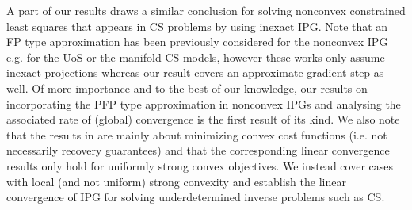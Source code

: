 A part of our results draws a similar conclusion for solving nonconvex constrained least squares that appears in CS problems by using inexact IPG. Note that an FP type approximation has been previously considered for the nonconvex IPG e.g. for the UoS \cite{Blumen} or the manifold \cite{MIP} CS models, however these works only assume inexact projections whereas our result covers  an approximate gradient step as well. Of more importance and to the best of our  knowledge, our results on incorporating the PFP type approximation in nonconvex IPGs and analysing the associated rate of (global) convergence is the first result of its kind. We also note that the results in \cite{BachinexactIPG} are mainly about minimizing convex cost functions (i.e. not necessarily recovery guarantees)
and that the corresponding   
linear convergence results 
only hold for uniformly strong convex objectives. We instead  
cover cases with local (and not uniform) strong convexity and establish the linear convergence of IPG for solving underdetermined inverse problems such as CS.  






